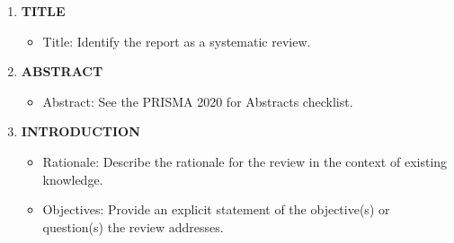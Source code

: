 \documentclass{article}
\begin{document}
\begin{enumerate}
    \item \textbf{TITLE}
    \begin{itemize}
        \item[1.] Title: Identify the report as a systematic review.
    \end{itemize}
    
    \item \textbf{ABSTRACT}
    \begin{itemize}
        \item[2.] Abstract: See the PRISMA 2020 for Abstracts checklist.
    \end{itemize}
    
    \item \textbf{INTRODUCTION}
    \begin{itemize}
        \item[3.] Rationale: Describe the rationale for the review in the context of existing knowledge.
        \item[4.] Objectives: Provide an explicit statement of the objective(s) or question(s) the review addresses.
    \end{itemize}
    

\end{enumerate}
\end{document}

